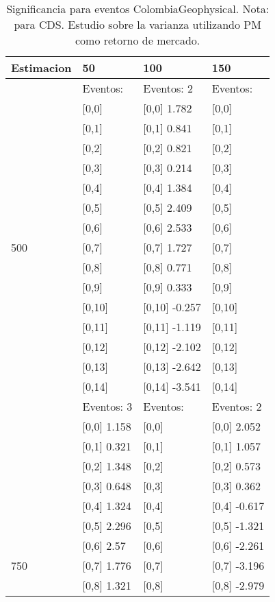 \begin{table}

\caption{Significancia para eventos ColombiaGeophysical. Nota: para CDS. Estudio sobre la varianza utilizando PM como retorno de mercado.}
\centering
\begin{tabular}[t]{llll}
\toprule
Estimacion & 50 & 100 & 150\\
\midrule
 & Eventos: & Eventos:  2 & Eventos:\\
 & {}[0,0] & {}[0,0] 1.782 & {}[0,0]\\
 & {}[0,1] & {}[0,1] 0.841 & {}[0,1]\\
 & {}[0,2] & {}[0,2] 0.821 & {}[0,2]\\
 & {}[0,3] & {}[0,3] 0.214 & {}[0,3]\\
\addlinespace
 & {}[0,4] & {}[0,4] 1.384 & {}[0,4]\\
 & {}[0,5] & {}[0,5] 2.409 & {}[0,5]\\
 & {}[0,6] & {}[0,6] 2.533 & {}[0,6]\\
500 & {}[0,7] & {}[0,7] 1.727 & {}[0,7]\\
 & {}[0,8] & {}[0,8] 0.771 & {}[0,8]\\
\addlinespace
 & {}[0,9] & {}[0,9] 0.333 & {}[0,9]\\
 & {}[0,10] & {}[0,10] -0.257 & {}[0,10]\\
 & {}[0,11] & {}[0,11] -1.119 & {}[0,11]\\
 & {}[0,12] & {}[0,12] -2.102 & {}[0,12]\\
 & {}[0,13] & {}[0,13] -2.642 & {}[0,13]\\
\addlinespace
 & {}[0,14] & {}[0,14] -3.541 & {}[0,14]\\
 & Eventos:  3 & Eventos: & Eventos:  2\\
 & {}[0,0] 1.158 & {}[0,0] & {}[0,0] 2.052\\
 & {}[0,1] 0.321 & {}[0,1] & {}[0,1] 1.057\\
 & {}[0,2] 1.348 & {}[0,2] & {}[0,2] 0.573\\
\addlinespace
 & {}[0,3] 0.648 & {}[0,3] & {}[0,3] 0.362\\
 & {}[0,4] 1.324 & {}[0,4] & {}[0,4] -0.617\\
 & {}[0,5] 2.296 & {}[0,5] & {}[0,5] -1.321\\
 & {}[0,6] 2.57 & {}[0,6] & {}[0,6] -2.261\\
750 & {}[0,7] 1.776 & {}[0,7] & {}[0,7] -3.196\\
\addlinespace
 & {}[0,8] 1.321 & {}[0,8] & {}[0,8] -2.979\\

\end{tabular}
\end{table}
